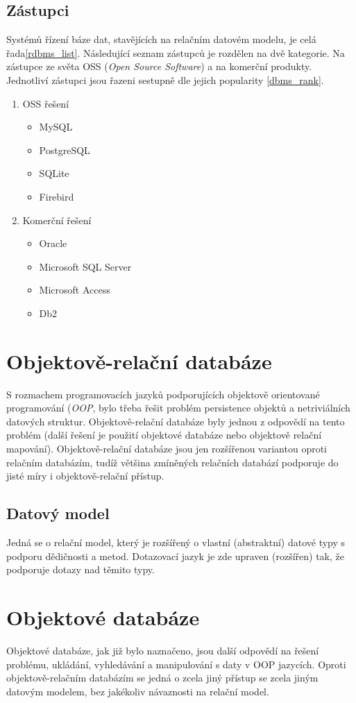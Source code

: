 \subsection{Zástupci}
Systémů řízení báze dat, stavějících na relačním datovém modelu, je celá řada\cref{rdbms_list}. Následující seznam zástupců je rozdělen na dvě kategorie. Na zástupce ze světa OSS (\textit{Open Source Software}) a na komerční produkty. Jednotliví zástupci jsou řazeni sestupně dle jejich popularity \cref{dbms_rank}.
\begin{enumerate}
  \item OSS řešení
  \begin{itemize}
    \item MySQL
    \item PostgreSQL
    \item SQLite
    \item Firebird
  \end{itemize}
  \item Komerční řešení
  \begin{itemize}
    \item Oracle
    \item Microsoft SQL Server
    \item Microsoft Access
    \item Db2
  \end{itemize}
\end{enumerate}
\section{Objektově-relační databáze}
S rozmachem programovacích jazyků podporujících objektově orientované programování (\emph{OOP}, bylo třeba řešit problém persistence objektů a netriviálních datových struktur. Objektově-relační databáze byly jednou z odpovědí na tento problém (další řešení je použití objektové databáze nebo objektově relační mapování). Objektově-relační databáze jsou jen rozšířenou variantou oproti relačním databázím, tudíž většina zmíněných relačních databází podporuje do jisté míry i objektově-relační přístup.
\subsection{Datový model}
Jedná se o relační model, který je rozšířený o vlastní (abstraktní) datové typy s podporu dědičnosti a metod. Dotazovací jazyk je zde upraven (rozšířen) tak, že podporuje dotazy nad těmito typy.\cite[s.~945--964]{korth:dbsc}

\section{Objektové databáze}
Objektové databáze, jak již bylo naznačeno, jsou další odpovědí na řešení problému, ukládání, vyhledávání a manipulování s daty v OOP jazycích. Oproti objektově-relačním databázím se jedná o zcela jiný přístup se zcela jiným datovým modelem, bez jakékoliv návaznosti na relační model.

